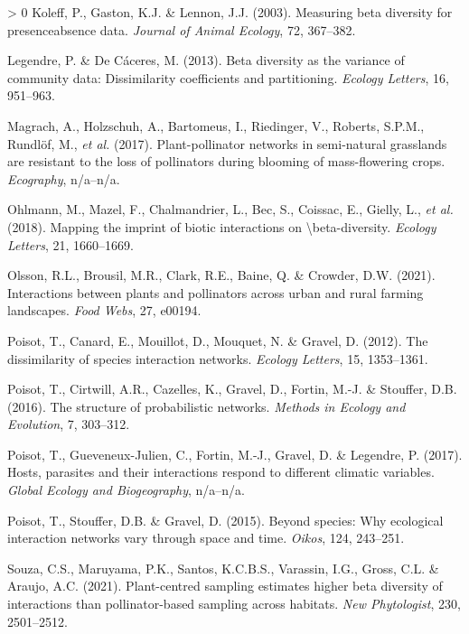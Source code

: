 \documentclass[11pt]{article}
\newlength{\cslhangindent}
\newenvironment{CSLReferences}[3] %
 {%
  \setlength{\parindent}{0pt}
  \ifodd #1 \everypar{\setlength{\hangindent}{\cslhangindent}}\ignorespaces\fi
  \ifnum #2 > 0
  \setlength{\parskip}{#2\baselineskip}
  \fi
 }%
 {}
\begin{document}
\begin{CSLReferences}{1}{0}
\leavevmode\hypertarget{ref-Koleff2003MeaBet}{}%
Koleff, P., Gaston, K.J. \& Lennon, J.J. (2003). Measuring beta
diversity for presenceabsence data. \emph{Journal of Animal Ecology},
72, 367--382.

\leavevmode\hypertarget{ref-Legendre2013BetDiv}{}%
Legendre, P. \& De Cáceres, M. (2013). Beta diversity as the variance of
community data: Dissimilarity coefficients and partitioning.
\emph{Ecology Letters}, 16, 951--963.

\leavevmode\hypertarget{ref-Magrach2017PlaNet}{}%
Magrach, A., Holzschuh, A., Bartomeus, I., Riedinger, V., Roberts,
S.P.M., Rundlöf, M., \emph{et al.} (2017). Plant-pollinator networks in
semi-natural grasslands are resistant to the loss of pollinators during
blooming of mass-flowering crops. \emph{Ecography}, n/a--n/a.

\leavevmode\hypertarget{ref-Ohlmann2018MapImp}{}%
Ohlmann, M., Mazel, F., Chalmandrier, L., Bec, S., Coissac, E., Gielly,
L., \emph{et al.} (2018). Mapping the imprint of biotic interactions on
\textbackslash beta-diversity. \emph{Ecology Letters}, 21, 1660--1669.

\leavevmode\hypertarget{ref-Olsson2021IntPla}{}%
Olsson, R.L., Brousil, M.R., Clark, R.E., Baine, Q. \& Crowder, D.W.
(2021). Interactions between plants and pollinators across urban and
rural farming landscapes. \emph{Food Webs}, 27, e00194.

\leavevmode\hypertarget{ref-Poisot2012DisSpe}{}%
Poisot, T., Canard, E., Mouillot, D., Mouquet, N. \& Gravel, D. (2012).
The dissimilarity of species interaction networks. \emph{Ecology
Letters}, 15, 1353--1361.

\leavevmode\hypertarget{ref-Poisot2016StrPro}{}%
Poisot, T., Cirtwill, A.R., Cazelles, K., Gravel, D., Fortin, M.-J. \&
Stouffer, D.B. (2016). The structure of probabilistic networks.
\emph{Methods in Ecology and Evolution}, 7, 303--312.

\leavevmode\hypertarget{ref-Poisot2017HosPar}{}%
Poisot, T., Gueveneux-Julien, C., Fortin, M.-J., Gravel, D. \& Legendre,
P. (2017). Hosts, parasites and their interactions respond to different
climatic variables. \emph{Global Ecology and Biogeography}, n/a--n/a.

\leavevmode\hypertarget{ref-Poisot2015SpeWhy}{}%
Poisot, T., Stouffer, D.B. \& Gravel, D. (2015). Beyond species: Why
ecological interaction networks vary through space and time.
\emph{Oikos}, 124, 243--251.

\leavevmode\hypertarget{ref-Souza2021PlaSam}{}%
Souza, C.S., Maruyama, P.K., Santos, K.C.B.S., Varassin, I.G., Gross,
C.L. \& Araujo, A.C. (2021). Plant-centred sampling estimates higher
beta diversity of interactions than pollinator-based sampling across
habitats. \emph{New Phytologist}, 230, 2501--2512.


\end{CSLReferences}
\end{document}
